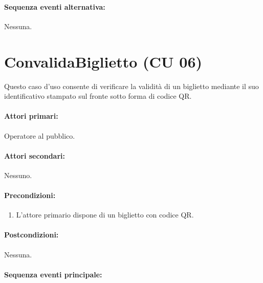 \documentclass{article}
\begin{document}
	\paragraph{Sequenza eventi alternativa:}Nessuna.
















\pagebreak 

		\section*{ConvalidaBiglietto (CU 06)}
	
	\indent\indent Questo caso d'uso consente di verificare la validità di un biglietto mediante il suo identificativo stampato  sul fronte sotto forma di codice QR. 
	
	\paragraph{Attori primari:}Operatore al pubblico.
	
	\paragraph{Attori secondari:}Nessuno.
	
	\paragraph{Precondizioni:}
			\begin{enumerate}	[itemsep=8pt,parsep=0pt]
				\item L'attore primario dispone di un biglietto con codice QR.
  			\end{enumerate}	
	
	\paragraph{Postcondizioni:}Nessuna.
	
	\paragraph{Sequenza eventi principale:}
\end{document}
